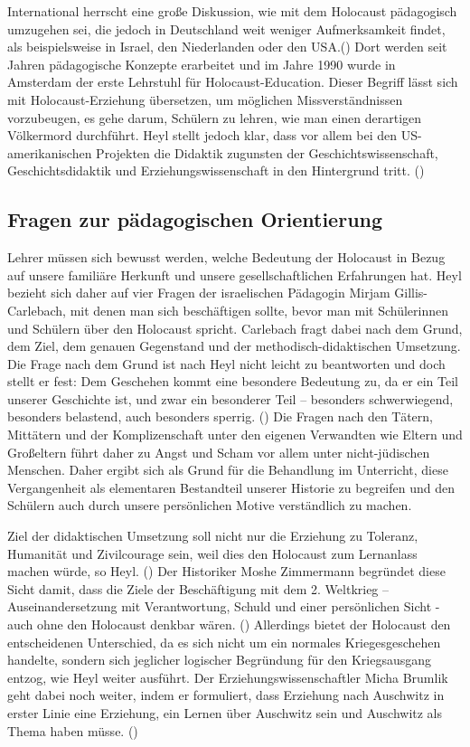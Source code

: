 International herrscht eine große Diskussion, wie mit dem Holocaust pädagogisch umzugehen sei, die jedoch in Deutschland weit weniger Aufmerksamkeit findet, als beispielsweise in Israel, den Niederlanden oder den USA.(\cite[S.\,64]{IA96}) Dort werden seit Jahren pädagogische Konzepte erarbeitet und im Jahre 1990 wurde in Amsterdam der erste Lehrstuhl für \glqq Holocaust-Education\grqq{}.
Dieser Begriff lässt sich mit \glqq Holocaust-Erziehung\grqq{} übersetzen, um möglichen Missverständnissen vorzubeugen, es gehe darum, Schülern zu lehren, wie man einen derartigen Völkermord durchführt.
Heyl stellt jedoch klar, dass vor allem bei den US-amerikanischen Projekten die Didaktik zugunsten der Geschichtswissenschaft, Geschichtsdidaktik und Erziehungswissenschaft in den Hintergrund tritt.
(\cite[S.\,64]{IA96})

\subsection{Fragen zur pädagogischen Orientierung}
Lehrer müssen sich bewusst werden, welche Bedeutung der Holocaust in Bezug auf unsere familiäre Herkunft und unsere gesellschaftlichen Erfahrungen hat.
Heyl bezieht sich daher auf vier Fragen der israelischen Pädagogin Mirjam Gillis-Carlebach, mit denen man sich beschäftigen sollte, bevor man mit Schülerinnen und Schülern über den Holocaust spricht.
Carlebach fragt dabei nach dem Grund, dem Ziel, dem genauen Gegenstand und der methodisch-didaktischen Umsetzung.
Die Frage nach dem Grund ist nach Heyl nicht leicht zu beantworten und doch stellt er fest: \glqq Dem Geschehen kommt eine besondere Bedeutung zu, da er ein Teil unserer Geschichte ist, und zwar ein besonderer Teil – besonders schwerwiegend, besonders belastend, auch besonders sperrig.\grqq{} (\cite[S.\,68]{IA96}) Die Fragen nach den Tätern, Mittätern und der Komplizenschaft unter den eigenen Verwandten wie Eltern und Großeltern führt daher zu Angst und Scham vor allem unter nicht-jüdischen Menschen.
Daher ergibt sich als Grund für die Behandlung im Unterricht, diese Vergangenheit als elementaren Bestandteil unserer Historie zu begreifen und den Schülern auch durch unsere persönlichen Motive verständlich zu machen.

Ziel der didaktischen Umsetzung soll nicht nur die Erziehung zu Toleranz, Humanität und Zivilcourage sein, weil dies den Holocaust zum Lernanlass machen würde, so Heyl. (\cite[S.\,68]{IA96})
Der Historiker Moshe Zimmermann begründet diese Sicht damit, dass die Ziele der Beschäftigung mit dem 2. Weltkrieg – Auseinandersetzung mit Verantwortung, Schuld und einer persönlichen Sicht - auch ohne den Holocaust denkbar wären. (\cite[S.\,69]{IA96})
Allerdings bietet der Holocaust den entscheidenen Unterschied, da es sich nicht um ein \glqq normales\grqq{} Kriegesgeschehen handelte, sondern sich jeglicher logischer Begründung für den Kriegsausgang entzog, wie Heyl weiter ausführt.
Der Erziehungswissenschaftler Micha Brumlik geht dabei noch weiter, indem er formuliert, dass \glqq Erziehung nach Auschwitz\grqq{} in erster Linie eine Erziehung, ein Lernen über Auschwitz sein und Auschwitz als Thema haben müsse. (\cite{MB95})

